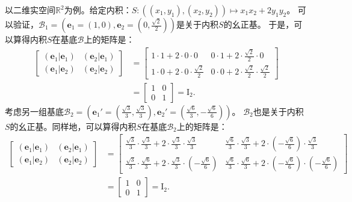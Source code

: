 \documentclass[12pt,UTF8]{ctexbook}
\begin{document}
以二维实空间$\mathbb{R}^2$为例。给定内积：$S: \left((x_1, y_1), (x_2, y_2) \right) \mapsto x_1 x_2 + 2 y_1 y_2$。
可以验证，$\mathcal{B}_1 = \left(\mathbf{e}_1 = (1, 0), \mathbf{e}_2 = \left(0, \frac{\sqrt{2}}{2}\right)\right)$是关于内积$S$的幺正基。
于是，可以算得内积$S$在基底$\mathcal{B}$上的矩阵是：
\begin{align*}
    \begin{bmatrix}
        (\mathbf{e}_1 |\mathbf{e}_1) & (\mathbf{e}_2 |\mathbf{e}_1) \\
        (\mathbf{e}_1 |\mathbf{e}_2) & (\mathbf{e}_2 |\mathbf{e}_2)
    \end{bmatrix} &= \begin{bmatrix}
        1\cdot 1 + 2\cdot 0\cdot 0 &  0\cdot 1 + 2 \cdot \frac{\sqrt{2}}{2} \cdot 0 \\
        1\cdot 0 + 2\cdot 0\cdot \frac{\sqrt{2}}{2} & 0\cdot 0 + 2\cdot \frac{\sqrt{2}}{2} \cdot \frac{\sqrt{2}}{2}
    \end{bmatrix}  \\
    &= \begin{bmatrix}
       1 & 0 \\
       0 & 1
    \end{bmatrix} = \mathrm{I}_2. 
\end{align*}
考虑另一组基底$\mathcal{B}_2 = \left(\mathbf{e}_1' = (\frac{\sqrt{3}}{3}, \frac{\sqrt{3}}{3}), \mathbf{e}_2' = \left(\frac{\sqrt{6}}{3}, -\frac{\sqrt{6}}{6}\right)\right)$。
$\mathcal{B}_2$也是关于内积$S$的幺正基。同样地，可以算得内积$S$在基底$\mathcal{B}_2$上的矩阵是：
\begin{align*}
    \begin{bmatrix}
        (\mathbf{e}_1 |\mathbf{e}_1) & (\mathbf{e}_2 |\mathbf{e}_1) \\
        (\mathbf{e}_1 |\mathbf{e}_2) & (\mathbf{e}_2 |\mathbf{e}_2)
    \end{bmatrix} &= \begin{bmatrix}
        \frac{\sqrt{3}}{3}\cdot \frac{\sqrt{3}}{3} + 2\cdot \frac{\sqrt{3}}{3} \cdot \frac{\sqrt{3}}{3} &  \frac{\sqrt{6}}{3}\cdot \frac{\sqrt{3}}{3} + 2\cdot \left(-\frac{\sqrt{6}}{6}\right) \cdot \frac{\sqrt{3}}{3} \\
        \frac{\sqrt{3}}{3}\cdot \frac{\sqrt{6}}{3} + 2\cdot \frac{\sqrt{3}}{3} \cdot \left(-\frac{\sqrt{6}}{6}\right) & \frac{\sqrt{6}}{3}\cdot \frac{\sqrt{6}}{3} + 2\cdot \left(-\frac{\sqrt{6}}{6}\right) \cdot \left(-\frac{\sqrt{6}}{6}\right)
    \end{bmatrix}  \\
    &= \begin{bmatrix}
       1 & 0 \\
       0 & 1
    \end{bmatrix} = \mathrm{I}_2. 
\end{align*}
\end{document}
